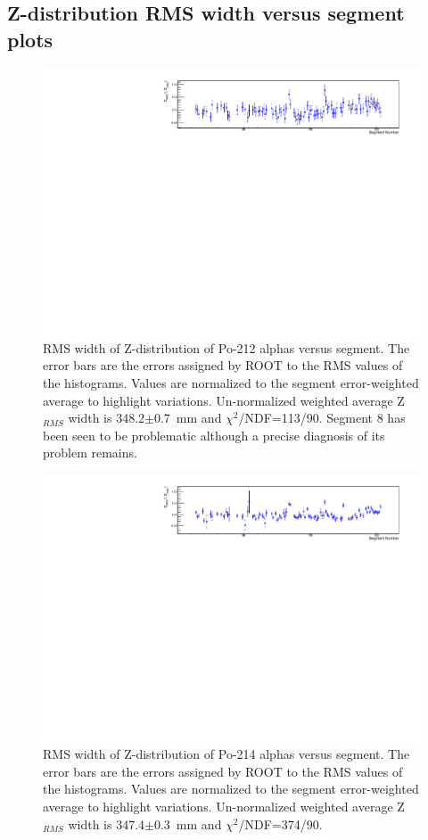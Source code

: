 \subsection{Z-distribution RMS width versus segment plots}
\begin{figure}[!h]
\centering
\includegraphics[width=1.05\textwidth]{figures/PubBiPo212ZRMSvsCell.pdf}
\caption{\label{fig:ZRMSvsCell212}RMS width of Z-distribution of Po-212 alphas versus segment. The error bars are the errors assigned by ROOT to the RMS values of the histograms. Values are normalized to the segment error-weighted average to highlight variations. Un-normalized weighted average Z$_{RMS}$ width is 348.2$\pm$0.7~mm and $\chi^2$/NDF=113/90. Segment 8 has been seen to be problematic although a precise diagnosis of its problem remains.}
\end{figure}
\begin{figure}[!h]
\centering
\includegraphics[width=1.05\textwidth]{figures/PubBiPo214ZRMSvsCell.pdf}
\caption{\label{fig:ZRMSvsCell214}RMS width of Z-distribution of Po-214 alphas versus segment. The error bars are the errors assigned by ROOT to the RMS values of the histograms. Values are normalized to the segment error-weighted average to highlight variations. Un-normalized weighted average Z$_{RMS}$ width is 347.4$\pm$0.3~mm and $\chi^2$/NDF=374/90.}
\end{figure}
\clearpage
\newpage
